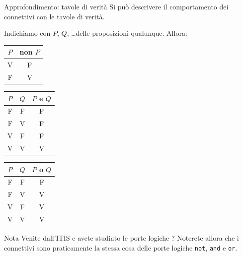 \documentclass[aspectratio=169,10pt]{beamer}
\begin{document}
\begin{frame}{Approfondimento: tavole di verità}
    Si può descrivere il comportamento dei connettivi con le \alert{tavole di verità}.

    \begin{example}
        Indichiamo con $P$, $Q$, \ldots delle proposizioni qualunque. Allora:
        \begin{center}
            \begin{tabular}[t]{c|c}
                $P$ & non $P$ \\
                \hline
                V & F       \\
                F & V
            \end{tabular}
            \hspace{2cm}
            \begin{tabular}[t]{c|c|c}
                $P$ & $Q$ & $P$ e $Q$ \\
                \hline
                F & F & F\\
                F & V & F\\
                V & F & F\\
                V & V & V\\
            \end{tabular}
            \hspace{2cm}
            \begin{tabular}[t]{c|c|c}
                $P$ & $Q$ & $P$ o $Q$ \\
                \hline
                F & F & F\\
                F & V & V\\
                V & F & V\\
                V & V & V\\
            \end{tabular}
        \end{center}
    \end{example}
    \begin{block}{Nota}
        Venite dall'ITIS e avete studiato le \alert{porte logiche} ? Noterete allora che i connettivi sono praticamente la stessa cosa delle porte logiche \texttt{not}, \texttt{and} e \texttt{or}.
    \end{block}
\end{frame}
\end{document}
